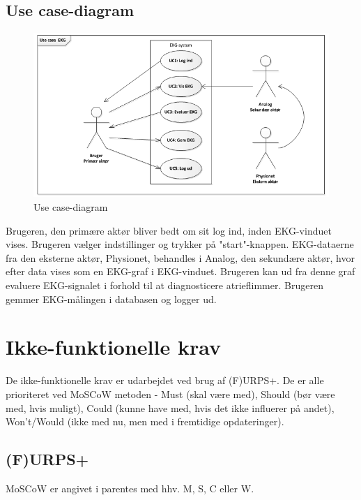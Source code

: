 \subsection{Use case-diagram}

\begin{figure}[htb]
	\centering
	\includegraphics[width=1\textwidth]{Figurer/Snip20150326_22}
	\caption{Use case-diagram}
	\label{fig:Use Cases}
\end{figure}

Brugeren, den primære aktør bliver bedt om sit log ind, inden EKG-vinduet vises. Brugeren vælger indstillinger og trykker på "start"-knappen. EKG-dataerne fra den eksterne aktør, Physionet, behandles i Analog, den sekundære aktør, hvor efter data vises som en EKG-graf i EKG-vinduet. Brugeren kan ud fra denne graf evaluere EKG-signalet i forhold til at diagnosticere atrieflimmer. Brugeren gemmer EKG-målingen i databasen og logger ud.  

\section{Ikke-funktionelle krav}
De ikke-funktionelle krav er udarbejdet ved brug af (F)URPS+. De er alle prioriteret ved MoSCoW metoden - Must (skal være med), Should (bør være med, hvis muligt), Could (kunne have med, hvis det ikke influerer på andet), Won't/Would (ikke med nu, men med i fremtidige opdateringer). 

\subsection{(F)URPS+}
MoSCoW er angivet i parentes med hhv. M, S, C eller W.


